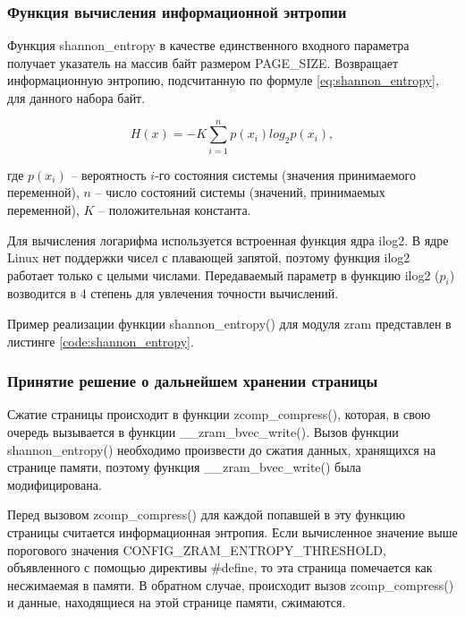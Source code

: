 \subsubsection{Функция вычисления информационной энтропии}

Функция shannon\_entropy в качестве единственного входного параметра получает указатель на массив байт размером PAGE\_SIZE. Возвращает информационную энтропию, подсчитанную по формуле \ref{eq:shannon_entropy}, для данного набора байт.

\begin{equation}\label{eq:shannon_entropy}
	H(x) = -K\sum^n_{i=1}p(x_{i})log_2{p(x_{i})},
\end{equation}

где $p(x_{i})$ -- вероятность $i$-го состояния системы (значения принимаемого переменной), $n$ -- число состояний системы (значений, принимаемых переменной), $K$ -- положительная константа.

Для вычисления логарифма используется встроенная функция ядра ilog2. В ядре Linux нет поддержки чисел с плавающей запятой, поэтому функция ilog2 работает только с целыми числами. Передаваемый параметр в функцию ilog2 ($p_{i}$) возводится в 4 степень для увлечения точности вычислений.

Пример реализации функции shannon\_entropy() для модуля zram представлен в листинге \ref{code:shannon_entropy}. 

\newpage


\subsubsection{Принятие решение о дальнейшем хранении страницы}

Сжатие страницы происходит в функции zcomp\_compress(), которая, в свою очередь вызывается в функции \_\_zram\_bvec\_write(). Вызов функции\\ shannon\_entropy() необходимо произвести до сжатия данных, хранящихся на странице памяти, поэтому функция \_\_zram\_bvec\_write() была модифицирована. 

Перед вызовом zcomp\_compress() для каждой попавшей в эту функцию страницы считается информационная энтропия. Если вычисленное значение выше порогового значения CONFIG\_ZRAM\_ENTROPY\_THRESHOLD, объявленного с помощью директивы \#define, то эта страница помечается как несжимаемая в памяти. В обратном случае, происходит вызов zcomp\_compress() и данные, находящиеся на этой странице памяти, сжимаются. 

